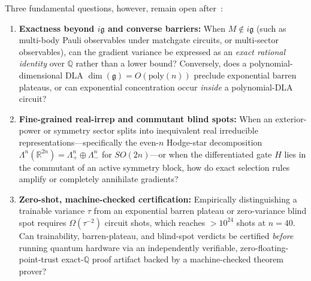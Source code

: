 \documentclass[11pt,a4paper]{article}
\theoremstyle{definition}
\theoremstyle{remark}
\newcommand{\QQ}{\mathbb{Q}}
\newcommand{\RR}{\mathbb{R}}
\newcommand{\lieg}{\mathfrak{g}}
\begin{document}
Three fundamental questions, however, remain open after~\cite{ragone2024lie,fontana2024characterizing,xie2026structure}:
\begin{enumerate}[leftmargin=1.8em,itemsep=2pt]
  \item \textbf{Exactness beyond $i\lieg$ and converse barriers:} When $M \notin i\lieg$ (such as multi-body Pauli observables under matchgate circuits, or multi-sector observables), can the gradient variance be expressed as an \emph{exact rational identity} over $\QQ$ rather than a lower bound? Conversely, does a polynomial-dimensional DLA $\dim(\lieg) = O(\mathrm{poly}(n))$ preclude exponential barren plateaus, or can exponential concentration occur \emph{inside} a polynomial-DLA circuit?
  \item \textbf{Fine-grained real-irrep and commutant blind spots:} When an exterior-power or symmetry sector splits into inequivalent real irreducible representations---specifically the even-$n$ Hodge-star decomposition $\Lambda^n(\RR^{2n}) = \Lambda^n_+ \oplus \Lambda^n_-$ for $SO(2n)$---or when the differentiated gate $H$ lies in the commutant of an active symmetry block, how do exact selection rules amplify or completely annihilate gradients?
  \item \textbf{Zero-shot, machine-checked certification:} Empirically distinguishing a trainable variance $\tau$ from an exponential barren plateau or zero-variance blind spot requires $\Omega(\tau^{-2})$ circuit shots, which reaches $>10^{24}$ shots at $n=40$. Can trainability, barren-plateau, and blind-spot verdicts be certified \emph{before} running quantum hardware via an independently verifiable, zero-floating-point-trust exact-$\QQ$ proof artifact backed by a machine-checked theorem prover?
\end{enumerate}
\end{document}
